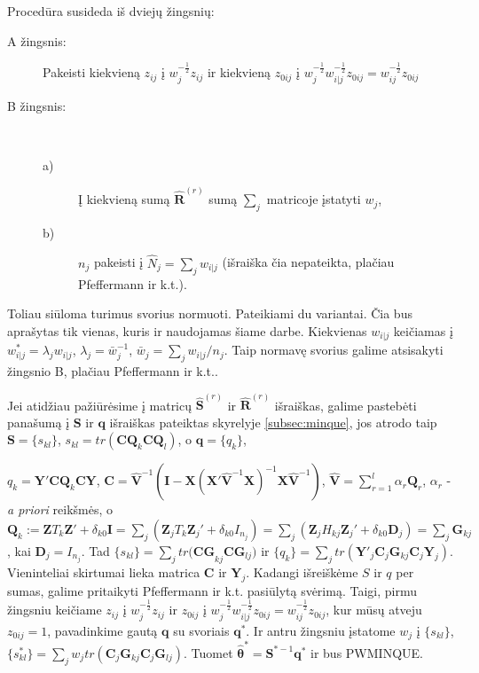 \documentclass[11pt,a4paper]{article}
\begin{document}
Procedūra susideda iš dviejų žingsnių:
\begin{description}
\item[A žingsnis:] Pakeisti kiekvieną $z_{ij}$ į $w_j^{-\frac{1}{2}}z_{ij}$ ir kiekvieną $z_{0ij}$ į $w_j^{-\frac{1}{2}}w_{i|j}^{-\frac{1}{2}}z_{0ij}=w_{ij}^{-\frac{1}{2}}z_{0ij}$
\item[B žingsnis:] \ 
\begin{description}
\item[a)] Į kiekvieną sumą $\hat{\mathbf{R}}^{(r)}$ sumą $\sum_j$  matricoje įstatyti $w_j$,
\item[b)] $n_j$ pakeisti į $\hat{N}_j=\sum_jw_{i|j}$ (išraiška čia nepateikta, plačiau  Pfeffermann ir k.t.\cite{pfeff}).
\end{description}
\end{description}

\indent Toliau siūloma turimus svorius normuoti. Pateikiami du variantai. Čia bus aprašytas tik vienas, kuris ir naudojamas šiame darbe.  Kiekvienas $w_{i|j}$ keičiamas į $w_{i|j}^*=\lambda_jw_{i|j}$, $\lambda_j=\bar{w}_j^{-1}$, $\bar{w}_j=\sum_jw_{i|j}/n_j$. Taip normavę svorius galime atsisakyti žingsnio B, plačiau Pfeffermann ir k.t.\cite{pfeff}.

\indent Jei atidžiau pažiūrėsime į matricų $\hat{\mathbf{S}}^{(r)}$ ir $\hat{\mathbf{R}}^{(r)}$ išraiškas, galime pastebėti panašumą į $\mathbf{S}$ ir $\mathbf{q}$ išraiškas pateiktas skyrelyje \ref{subsec:minque}, jos atrodo taip $\mathbf{S}=\{s_{kl}\}$, $s_{kl}=tr(\mathbf{CQ}_k\mathbf{CQ}_l)$, o
$\mathbf{q}=\{q_k\}$,

\noindent $q_k=\mathbf{Y'CQ}_k\mathbf{CY}$, $\mathbf{C} = \mathbf{\hat{V}}^{-1}\left(\mathbf{I}-\mathbf{X}\left(\mathbf{X' \hat{V}}^{-1}\mathbf{X}\right)^{-1}\mathbf{X \hat{V}}^{-1}\right)$, $\mathbf{\hat{V}}=\sum^l_{r=1}\alpha_r\mathbf{Q}_r$, $\alpha_r$ - \textit{a priori} reikšmės, o $\mathbf{Q}_k:= \mathbf{Z}T_k\mathbf{Z'}+\delta_{k0}\mathbf{I}=\sum_j(\mathbf{Z}_jT_k\mathbf{Z}_j'+\delta_{k0}I_{n_j})=\sum_j(\mathbf{Z}_jH_{kj}\mathbf{Z}_j'+ \delta_{k0}\mathbf{D}_j)=\sum_j\mathbf{G}_{kj}$, kai $\mathbf{D}_j=I_{n_j}$. Tad $\{s_{kl}\}=\sum_jtr\mathbf{(CG}_{kj}\mathbf{CG}_{lj})$ ir $\{q_k\}=\sum_jtr(\mathbf{Y}'_j\mathbf{C}_j\mathbf{G}_{kj}\mathbf{C}_j\mathbf{Y}_j)$. Vieninteliai skirtumai lieka matrica $\mathbf{C}$ ir $\mathbf{Y}_j$. Kadangi išreiškėme $S$ ir $q$ per sumas, galime pritaikyti  Pfeffermann ir k.t.\cite{pfeff} pasiūlytą svėrimą. Taigi, pirmu žingsniu keičiame $z_{ij}$ į $w_j^{-\frac{1}{2}}z_{ij}$ ir $z_{0ij}$ į $w_j^{-\frac{1}{2}}w_{i|j}^{-\frac{1}{2}}z_{0ij}=w_{ij}^{-\frac{1}{2}}z_{0ij}$, kur mūsų atveju $z_{0ij}=1$, pavadinkime gautą $\mathbf{q}$ su svoriais $\mathbf{q}^*$. Ir antru žingsniu įstatome $w_j$ į $\{s_{kl}\}$, $\{s^*_{kl}\}=\sum_jw_jtr(\mathbf{C}_j\mathbf{G}_{kj}\mathbf{C}_j\mathbf{G}_{lj})$. Tuomet $\hat{\boldsymbol{\theta}}^*=\mathbf{S}^{*-1}\mathbf{q}^*$ ir bus PWMINQUE.
\end{document}
